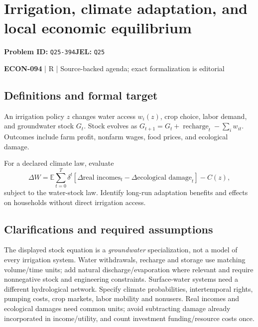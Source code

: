 \documentclass[11pt,a4paper]{article}
\begin{document}
\section*{Irrigation, climate adaptation, and local economic equilibrium}
\textbf{Problem ID:} \texttt{Q25-394}\quad \textbf{JEL:} \texttt{Q25}\par
\label{problem:OP-0652}


\label{audited:ECON-094}

{\sffamily\small\color{muted}\textbf{ECON-094} | R | Source-backed agenda; exact formalization is editorial\par}

\subsection*{Definitions and formal target}

An irrigation policy $z$ changes water access $w_i(z)$, crop choice, labor demand, and groundwater stock $G_t$. Stock evolves as $G_{t+1}=G_t+\operatorname{recharge}_t-\sum_iw_{it}$. Outcomes include farm profit, nonfarm wages, food prices, and ecological damage.

For a declared climate law, evaluate
\[
 \Delta W=\mathbb E\sum_{t=0}^{T}\delta^t
 [\Delta\text{real incomes}_t-\Delta\text{ecological damage}_t]-C(z),
\]
subject to the water-stock law. Identify long-run adaptation benefits and effects on households without direct irrigation access.

\subsection*{Clarifications and required assumptions}

The displayed stock equation is a \emph{groundwater} specialization, not a model of every irrigation system. Water withdrawals, recharge and storage use matching volume/time units; add natural discharge/evaporation where relevant and require nonnegative stock and engineering constraints. Surface-water systems need a different hydrological network. Specify climate probabilities, intertemporal rights, pumping costs, crop markets, labor mobility and nonusers. Real incomes and ecological damages need common units; avoid subtracting damage already incorporated in income/utility, and count investment funding/resource costs once.
\end{document}
